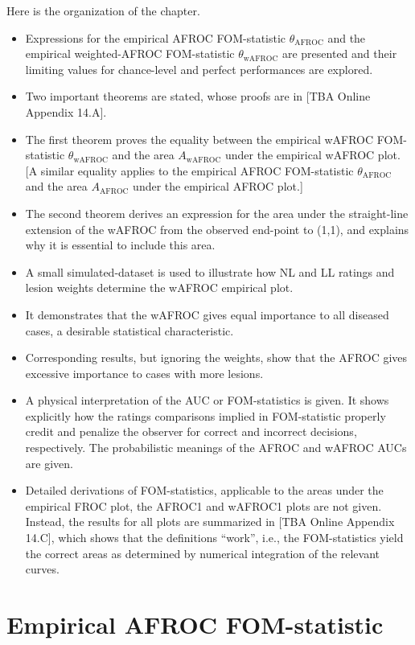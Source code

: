\documentclass[
]{book}
\begin{document}
Here is the organization of the chapter.

\begin{itemize}
\item
  Expressions for the empirical AFROC FOM-statistic \(\theta_{\text{AFROC}}\) and the empirical weighted-AFROC FOM-statistic \(\theta_{\text{wAFROC}}\) are presented and their limiting values for chance-level and perfect performances are explored.
\item
  Two important theorems are stated, whose proofs are in {[}TBA Online Appendix 14.A{]}.
\item
  The first theorem proves the equality between the empirical wAFROC FOM-statistic \(\theta_{\text{wAFROC}}\) and the area \(A_{\text{wAFROC}}\) under the empirical wAFROC plot. {[}A similar equality applies to the empirical AFROC FOM-statistic \(\theta_{\text{AFROC}}\) and the area \(A_{\text{AFROC}}\) under the empirical AFROC plot.{]}
\item
  The second theorem derives an expression for the area under the straight-line extension of the wAFROC from the observed end-point to (1,1), and explains why it is essential to include this area.
\item
  A small simulated-dataset is used to illustrate how NL and LL ratings and lesion weights determine the wAFROC empirical plot.
\item
  It demonstrates that the wAFROC gives equal importance to all diseased cases, a desirable statistical characteristic.
\item
  Corresponding results, but ignoring the weights, show that the AFROC gives excessive importance to cases with more lesions.
\item
  A physical interpretation of the AUC or FOM-statistics is given. It shows explicitly how the ratings comparisons implied in FOM-statistic properly credit and penalize the observer for correct and incorrect decisions, respectively. The probabilistic meanings of the AFROC and wAFROC AUCs are given.
\item
  Detailed derivations of FOM-statistics, applicable to the areas under the empirical FROC plot, the AFROC1 and wAFROC1 plots are not given. Instead, the results for all plots are summarized in {[}TBA Online Appendix 14.C{]}, which shows that the definitions ``work'', i.e., the FOM-statistics yield the correct areas as determined by numerical integration of the relevant curves.
\end{itemize}

\hypertarget{froc-meanings-afroc}{%
\section{Empirical AFROC FOM-statistic}\label{froc-meanings-afroc}}
\end{document}
